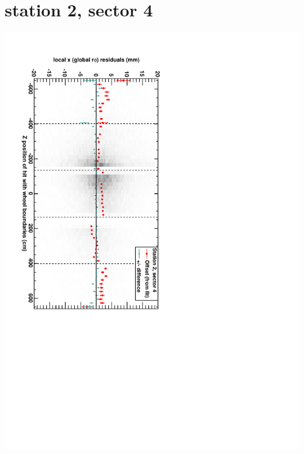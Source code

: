 \documentclass[compress]{beamer}
\begin{document}
\section*{station 2, sector 4}
\begin{frame} \vfill \mbox{\hspace{-1 cm}\includegraphics[height=1.2\linewidth, angle=90]{DTrphiVsZ_st2_sr04.pdf}} \end{frame}
\end{document}
